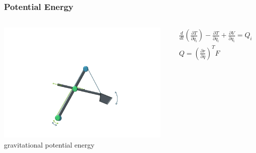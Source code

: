 
\begin{frame}
	\frametitle{Potential Energy}
	\begin{columns}
		\centering
		\includegraphics[trim=30cm 5cm 30cm 23cm, clip=true, width=\linewidth]{img/Excavator_Only}
		gravitational potential energy\\
		\onslide<2->
		\begin{small}
		\begin{align*}
			&\frac{d}{dt}\left(\frac{\partial T}{\partial \dot{q}_i}\right) -
			\frac{\partial T}{\partial q_i} +
			\frac{\partial V}{\partial q_i}
			= Q_i \\
			& Q = \left(\frac{\partial r}{\partial q}\right)^T F\\
		\end{align*}
	    \end{small}
	\end{columns}
\end{frame}


